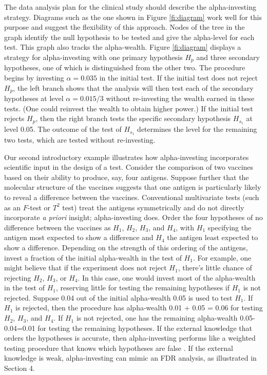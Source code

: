 \documentclass[12pt]{article}
\begin{document}
 The data analysis plan for the clinical study should describe the
 alpha-investing strategy.  Diagrams such as the one shown in Figure
 \ref{fi:diagram} work well for this purpose and suggest the flexibility of this
 approach.  Nodes of the tree in the graph identify the null hypothesis to be
 tested and give the alpha-level for each test.  This graph also tracks the
 alpha-wealth.  Figure \ref{fi:diagram} displays a strategy for alpha-investing
 with one primary hypothesis $H_p$ and three secondary hypotheses, one of which
 is distinguished from the other two.  The procedure begins by investing
 $\alpha=0.035$ in the initial test.  If the initial test does not reject $H_p$,
 the left branch shows that the analysis will then test each of the secondary
 hypotheses at level $\alpha = 0.015/3$ without re-investing the wealth earned
 in these tests.  (One could reinvest the wealth to obtain higher power.)  If
 the initial test rejects $H_p$, then the right branch tests the specific
 secondary hypothesis $H_{s_1}$ at level 0.05.  The outcome of the test of
 $H_{s_1}$ determines the level for the remaining two tests, which are tested
 without re-investing.


 Our second introductory example illustrates how alpha-investing incorporates
 scientific input in the design of a test.  Consider the comparison of two
 vaccines based on their ability to produce, say, four antigens.  Suppose
 further that the molecular structure of the vaccines suggests that one antigen
 is particularly likely to reveal a difference between the vaccines.
  Conventional multivariate tests (such as an $F$-test or $T^2$ test) treat the
 antigens symmetrically and do not directly incorporate {\it a priori} insight;
 alpha-investing does.  Order the four hypotheses of no difference between the
 vaccines as $H_1$, $H_2$, $H_3$, and $H_4$, with $H_1$ specifying the antigen
 most expected to show a difference and $H_4$ the antigen least expected to show
 a difference.  Depending on the strength of this ordering of the antigens,
 invest a fraction of the initial alpha-wealth in the test of $H_1$.  For
 example, one might believe that if the experiment does not reject $H_1$,
 there's little chance of rejecting $H_2$, $H_3$, or $H_4$.  In this case, one
 would invest most of the alpha-wealth in the test of $H_1$, reserving little
 for testing the remaining hypotheses if $H_1$ is not rejected.  Suppose 0.04
 out of the initial alpha-wealth 0.05 is used to test $H_1$.  If $H_1$ is
 rejected, then the procedure has alpha-wealth 0.01 + 0.05 = 0.06 for testing
 $H_2$, $H_3$, and $H_4$.  If $H_1$ is not rejected, one has the remaining
 alpha-wealth 0.05-0.04=0.01 for testing the remaining hypotheses.  If the
 external knowledge that orders the hypotheses is accurate, then alpha-investing
 performs like a weighted testing procedure that knows which hypotheses are
 false \citep{fosterstine08}. If the external knowledge is weak, alpha-investing
 can mimic an FDR analysis, as illustrated in Section 4.
\end{document}
